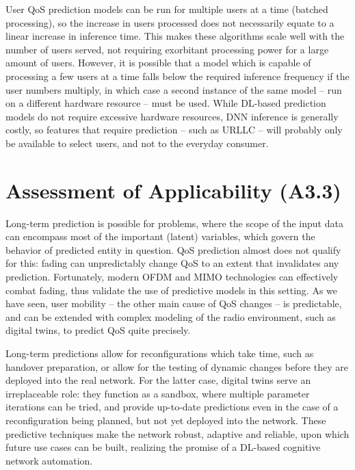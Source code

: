 		User \ac{QoS} prediction models can be run for multiple users at a time (batched processing), so the increase in users processed does not necessarily equate to a linear increase in inference time.
		This makes these algorithms scale well with the number of users served, not requiring exorbitant processing power for a large amount of users.
		However, it is possible that a model which is capable of processing a few users at a time falls below the required inference frequency if the user numbers multiply, in which case a second instance of the same model -- run on a different hardware resource -- must be used.
		While \ac{DL}-based prediction models do not require excessive hardware resources, \ac{DNN} inference is generally costly, so features that require prediction -- such as \ac{URLLC} -- will probably only be available to select users, and not to the everyday consumer.
				
	\section{Assessment of Applicability (A3.3)}
	
		Long-term prediction is possible for problems, where the scope of the input data can encompass most of the important (latent) variables, which govern the behavior of predicted entity in question.		
		\ac{QoS} prediction almost does not qualify for this: fading can unpredictably change \ac{QoS} to an extent that invalidates any prediction.
		Fortunately, modern \ac{OFDM} and \ac{MIMO} technologies can effectively combat fading, thus validate the use of predictive models in this setting.
		As we have seen, user mobility -- the other main cause of \ac{QoS} changes -- is predictable, and can be extended with complex modeling of the radio environment, such as digital twins, to predict \ac{QoS} quite precisely.
				
		Long-term predictions allow for reconfigurations which take time, such as handover preparation, or allow for the testing of dynamic changes before they are deployed into the real network.
		For the latter case, digital twins serve an irreplaceable role: they function as a sandbox, where multiple parameter iterations can be tried, and provide up-to-date predictions even in the case of a reconfiguration being planned, but not yet deployed into the network.
		These predictive techniques make the network robust, adaptive and reliable, upon which future use cases can be built, realizing the promise of a \ac{DL}-based cognitive network automation.
	
